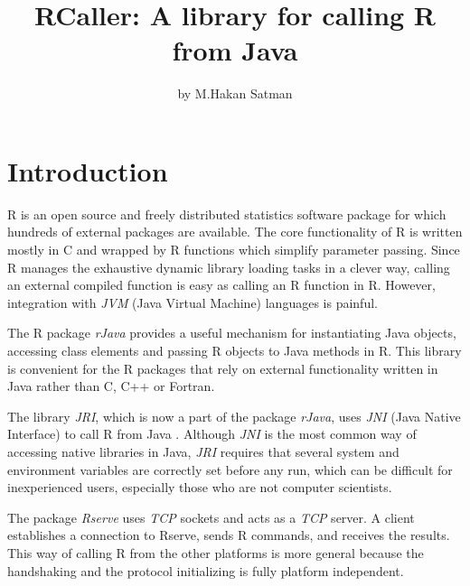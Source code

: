 \documentclass[10pt,a4paper]{article}
\title{RCaller: A library for calling R from Java}
\author{by M.Hakan Satman}
\begin{document}
\maketitle
\tableofcontents


\section{Introduction}
R \cite{RCoreTeam:2011} is an open source and freely distributed statistics software package for which  
hundreds of external packages are available. The core functionality of R is written mostly in C
and wrapped by R functions which simplify parameter passing. Since R manages the exhaustive
dynamic library loading tasks in a clever way, calling an external compiled function is easy as calling an R function in R.
However, integration with \emph{JVM} (Java Virtual Machine) languages is painful. 

The R package \emph{rJava} \cite{Urbanek:2011a} provides a useful mechanism
for instantiating Java objects, accessing class elements and passing R objects to Java methods in R. This library
is convenient for the R packages that rely on external functionality written in Java rather than C, C++ or Fortran.

The library \emph{JRI}, which is now a part of the package \emph{rJava}, uses \emph{JNI} (Java Native Interface) to call 
R from Java \cite{Urbanek:2009}. Although \emph{JNI} is the most common
way of accessing native libraries in Java, \emph{JRI} requires that several system and environment variables are correctly set before
any run, which can be difficult for inexperienced users, especially those who are not computer scientists.

The package \emph{Rserve} \cite{Urbanek:2011b} uses \emph{TCP} sockets and acts as a \emph{TCP} server. A client establishes a connection
to Rserve, sends R commands, and receives the results. This way of calling R from the other platforms is more general
because the handshaking and the protocol initializing is fully platform independent. 
\end{document}
